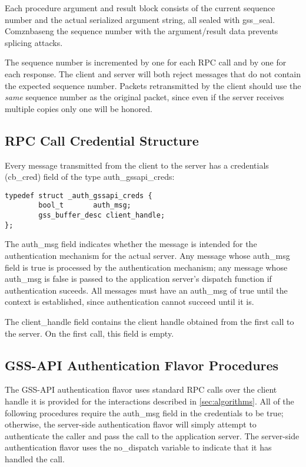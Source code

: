 Each procedure argument and result block consists of the current
sequence number and the actual serialized argument string, all sealed
with gss_seal.  Comznbaseng the sequence number with the argument/result
data prevents splicing attacks.

The sequence number is incremented by one for each RPC call and by one
for each response.  The client and server will both reject messages
that do not contain the expected sequence number.  Packets
retransmitted by the client should use the {\it same} sequence number
as the original packet, since even if the server receives multiple
copies only one will be honored.

\subsection{RPC Call Credential Structure}

Every message transmitted from the client to the server has a
credentials (cb_cred) field of the type auth_gssapi_creds:

\begin{verbatim}
typedef struct _auth_gssapi_creds {
        bool_t       auth_msg;
        gss_buffer_desc client_handle;
};
\end{verbatim}

The auth_msg field indicates whether the message is intended for the
authentication mechanism for the actual server.  Any message whose
auth_msg field is true is processed by the authentication mechanism;
any message whose auth_msg is false is passed to the application
server's dispatch function if authentication suceeds.  All messages
must have an auth_msg of true until the context is established, since
authentication cannot succeed until it is.

The client_handle field contains the client handle obtained from the
first call to the server.  On the first call, this field is empty.

\subsection{GSS-API Authentication Flavor Procedures}

The GSS-API authentication flavor uses standard RPC calls over the
client handle it is provided for the interactions described in
\ref{sec:algorithms}.  All of the following procedures require the
auth_msg field in the credentials to be true; otherwise, the
server-side authentication flavor will simply attempt to authenticate
the caller and pass the call to the application server.  The
server-side authentication flavor uses the no_dispatch variable to
indicate that it has handled the call.

